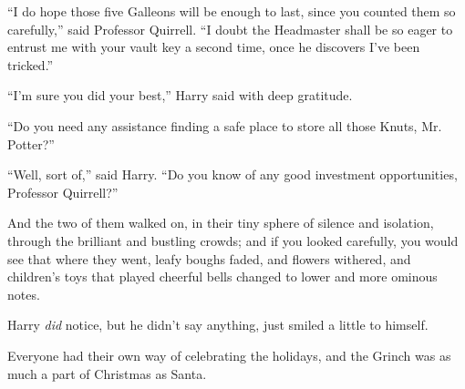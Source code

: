``I do hope those five Galleons will be enough to last, since you counted them so carefully,'' said Professor Quirrell. ``I doubt the Headmaster shall be so eager to entrust me with your vault key a second time, once he discovers I've been tricked.''

``I'm sure you did your best,'' Harry said with deep gratitude.

``Do you need any assistance finding a safe place to store all those Knuts, Mr. Potter?''

``Well, sort of,'' said Harry. ``Do you know of any good investment opportunities, Professor Quirrell?''

And the two of them walked on, in their tiny sphere of silence and isolation, through the brilliant and bustling crowds; and if you looked carefully, you would see that where they went, leafy boughs faded, and flowers withered, and children's toys that played cheerful bells changed to lower and more ominous notes.

Harry \emph{did} notice, but he didn't say anything, just smiled a little to himself.

Everyone had their own way of celebrating the holidays, and the Grinch was as much a part of Christmas as Santa.
